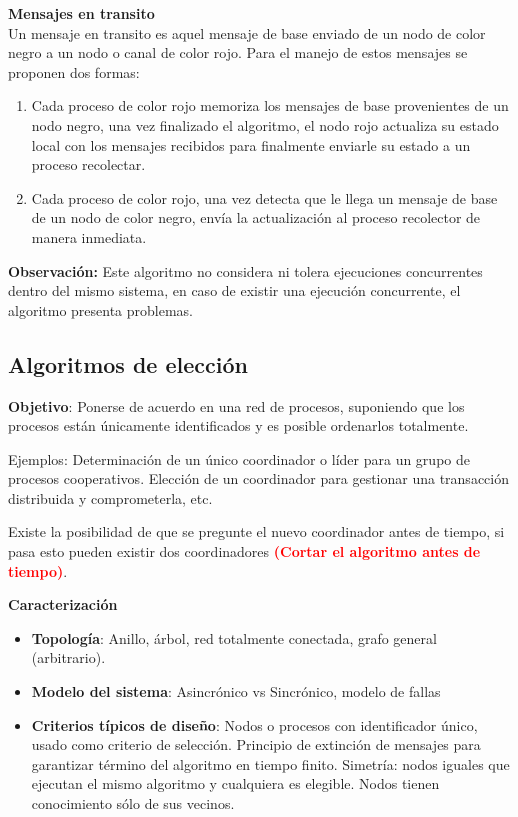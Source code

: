 \textbf{Mensajes en transito}\\
Un mensaje en transito es aquel mensaje de base enviado de un nodo de color negro a un nodo o canal de color rojo. Para el manejo de estos mensajes se proponen dos formas:

\begin{enumerate}
  \item Cada proceso de color rojo memoriza los mensajes de base provenientes de un nodo negro, una vez finalizado el algoritmo, el nodo rojo actualiza su estado local con los mensajes recibidos para finalmente enviarle su estado a un proceso recolectar.
  \item Cada proceso de color rojo, una vez detecta que le llega un mensaje de base de un nodo de color negro, envía la actualización al proceso recolector de manera inmediata.
\end{enumerate}

\textbf{Observación:} Este algoritmo no considera ni tolera ejecuciones concurrentes dentro del mismo sistema, en caso de existir una ejecución concurrente, el algoritmo presenta problemas.

\subsection{Algoritmos de elección}
\textbf{Objetivo}: Ponerse de acuerdo en una red de procesos, suponiendo que los procesos están únicamente identificados y es posible ordenarlos totalmente.

Ejemplos: Determinación de un único coordinador o líder para un grupo de procesos cooperativos. Elección de un coordinador para gestionar una transacción distribuida y comprometerla, etc.

Existe la posibilidad de que se pregunte el nuevo coordinador antes de tiempo, si pasa esto pueden existir dos coordinadores \textcolor{red}{\textbf{(Cortar el algoritmo antes de tiempo)}}.
\vspace{0.5em}

\textbf{Caracterización} \begin{itemize}
    \item \textbf{Topología}: Anillo, árbol, red totalmente conectada, grafo general (arbitrario).
    \item \textbf{Modelo del sistema}: Asincrónico vs Sincrónico, modelo de fallas
    \item \textbf{Criterios típicos de diseño}: Nodos o procesos con identificador único, usado como criterio de selección. Principio de extinción de mensajes para garantizar término del algoritmo en tiempo finito. Simetría: nodos iguales que ejecutan el mismo algoritmo y cualquiera es elegible. Nodos tienen conocimiento sólo de sus vecinos.
\end{itemize}

